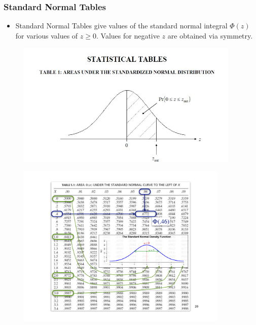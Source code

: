 \documentclass[notes=show,smaller,handout]{beamer}
\newenvironment{stepitemize}{\begin{itemize}[<+->]}{\end{itemize} }
\begin{document}
\begin{frame}%

\frametitle{Standard Normal Tables}

\begin{stepitemize}
\item Standard Normal Tables give values of the standard normal integral $\Phi(z)$ for various values of $z\geq 0$.  Values for negative $z$ are obtained via symmetry.
\end{stepitemize}


\begin{figure}[ptb]\centering
\includegraphics[width=0.95\textwidth,height=0.75\textheight]{bell_curve__5.pdf}%
\end{figure}%
\end{frame}%


\begin{frame}%
\begin{figure}[ptb]\centering
\includegraphics[width=0.9\textwidth,height=0.95\textheight]{myTableGauss.pdf}%
\end{figure}%
\end{frame}%
\end{document}
